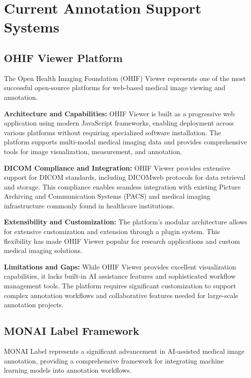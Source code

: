 \section{Current Annotation Support Systems}

\subsection{OHIF Viewer Platform}

The Open Health Imaging Foundation (OHIF) Viewer represents one of the most successful open-source platforms for web-based medical image viewing and annotation.

\textbf{Architecture and Capabilities:} OHIF Viewer is built as a progressive web application using modern JavaScript frameworks, enabling deployment across various platforms without requiring specialized software installation. The platform supports multi-modal medical imaging data and provides comprehensive tools for image visualization, measurement, and annotation.

\textbf{DICOM Compliance and Integration:} OHIF Viewer provides extensive support for DICOM standards, including DICOMweb protocols for data retrieval and storage. This compliance enables seamless integration with existing Picture Archiving and Communication Systems (PACS) and medical imaging infrastructure commonly found in healthcare institutions.

\textbf{Extensibility and Customization:} The platform's modular architecture allows for extensive customization and extension through a plugin system. This flexibility has made OHIF Viewer popular for research applications and custom medical imaging solutions.

\textbf{Limitations and Gaps:} While OHIF Viewer provides excellent visualization capabilities, it lacks built-in AI assistance features and sophisticated workflow management tools. The platform requires significant customization to support complex annotation workflows and collaborative features needed for large-scale annotation projects.

\subsection{MONAI Label Framework}

MONAI Label represents a significant advancement in AI-assisted medical image annotation, providing a comprehensive framework for integrating machine learning models into annotation workflows.

